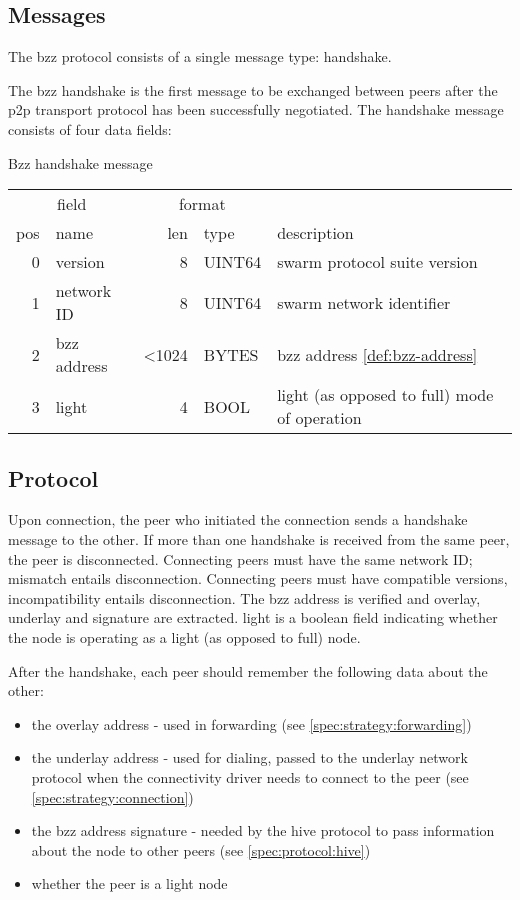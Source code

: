 \subsection{Messages}
The bzz protocol consists of a single message type: handshake.

The bzz handshake is the first message to be exchanged between peers after the p2p transport protocol has been successfully negotiated. The handshake message consists of four data fields:

\begin{definition}{Bzz handshake message}\label{def:bzz-handshake}

\begin{tabular}{r|l|r|l|l}
\multicolumn{2}{c|}{field}& 
\multicolumn{2}{c|}{format}& 
\\
pos & name  & len & type & description \\\hline
0  & version & 8 & UINT64 & swarm protocol suite version\\\hline
1  & network ID & 8 & UINT64 & swarm network identifier\\\hline
2 & bzz address & <1024 & BYTES & bzz address \ref{def:bzz-address}\\\hline
3 & light & 4 & BOOL & light (as opposed to full) mode of operation
\end{tabular}
\end{definition}

\subsection{Protocol}

Upon connection, the peer who initiated the connection sends a handshake message to the other. If more than one handshake is received from the same peer, the peer is disconnected.
Connecting peers must have the same network ID; mismatch entails disconnection.
Connecting peers must have compatible versions, incompatibility entails disconnection.
The bzz address is verified and overlay, underlay and signature are extracted.
light is a boolean field indicating whether the node is operating as a light (as opposed to full) node.

After the handshake,  each peer should remember the following data about the other:

\begin{itemize}
    \item the overlay address - used in forwarding  (see  \ref{spec:strategy:forwarding})
    \item the underlay address - used for dialing, passed to the underlay network protocol when the connectivity driver needs to connect to the peer (see \ref{spec:strategy:connection})
    \item the bzz address signature - needed by the hive protocol to pass information about the node to other peers (see \ref{spec:protocol:hive})
    \item whether the peer is a light node
\end{itemize}

